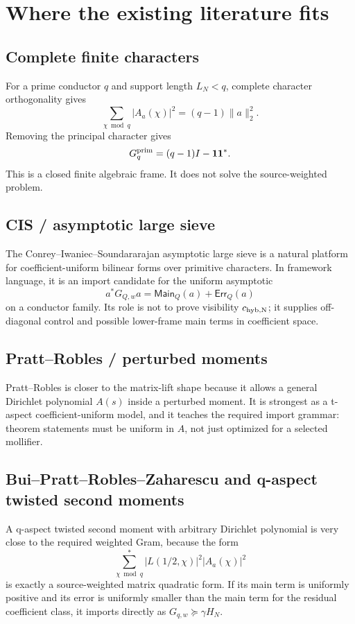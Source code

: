 \documentclass[11pt]{article}
\begin{document}
\section{Where the existing literature fits}
\subsection{Complete finite characters}
For a prime conductor $q$ and support length $L_N<q$, complete character orthogonality gives
\[
\sum_{\chi\bmod q}|A_a(\chi)|^2=(q-1)\|a\|_2^2.
\]
Removing the principal character gives
\[
G_q^{\rm prim}=(q-1)I-\mathbf 1\mathbf 1^*.
\]
This is a closed finite algebraic frame.  It does not solve the source-weighted problem.

\subsection{CIS / asymptotic large sieve}
The Conrey--Iwaniec--Soundararajan asymptotic large sieve is a natural platform for coefficient-uniform bilinear forms over primitive characters.  In framework language, it is an import candidate for the uniform asymptotic
\[
a^*G_{Q,w}a=\mathsf{Main}_Q(a)+\mathsf{Err}_Q(a)
\]
on a conductor family.  Its role is not to prove visibility $c_{\rm hyb,N}$; it supplies off-diagonal control and possible lower-frame main terms in coefficient space.

\subsection{Pratt--Robles / perturbed moments}
Pratt--Robles is closer to the matrix-lift shape because it allows a general Dirichlet polynomial $A(s)$ inside a perturbed moment.  It is strongest as a t-aspect coefficient-uniform model, and it teaches the required import grammar: theorem statements must be uniform in $A$, not just optimized for a selected mollifier.

\subsection{Bui--Pratt--Robles--Zaharescu and q-aspect twisted second moments}
A q-aspect twisted second moment with arbitrary Dirichlet polynomial is very close to the required weighted Gram, because the form
\[
\sum_{\chi\bmod q}^{*}|L(1/2,\chi)|^2|A_a(\chi)|^2
\]
is exactly a source-weighted matrix quadratic form.  If its main term is uniformly positive and its error is uniformly smaller than the main term for the residual coefficient class, it imports directly as $G_{q,w}\succeq \gamma H_N$.
\end{document}

